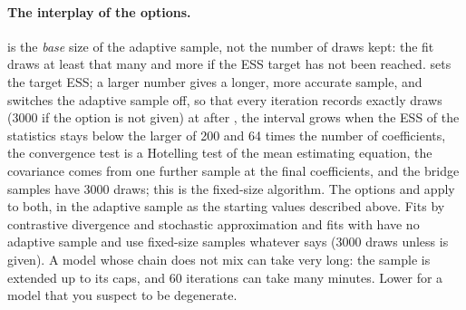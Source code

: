 \paragraph{The interplay of the options.}  is the \emph{base} size of the adaptive sample, not the number of draws kept: the fit draws at least that many and more if the ESS target has not been reached.  sets the target ESS; a larger number gives a longer, more accurate sample, and  switches the adaptive sample off, so that every iteration records exactly  draws (3000 if the option is not given) at  after , the interval grows when the ESS of the statistics stays below the larger of 200 and 64 times the number of coefficients, the convergence test is a Hotelling test of the mean estimating equation, the covariance comes from one further sample at the final coefficients, and the bridge samples have 3000 draws; this is the fixed-size algorithm. The options  and  apply to both, in the adaptive sample as the starting values described above. Fits by contrastive divergence and stochastic approximation and fits with  have no adaptive sample and use fixed-size samples whatever  says (3000 draws unless  is given). A model whose chain does not mix can take very long: the sample is extended up to its caps, and 60 iterations can take many minutes. Lower  for a model that you suspect to be degenerate.

